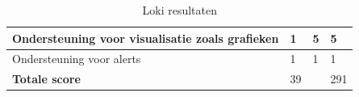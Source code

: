 \begin{table}[]
\begin{tabular}{| m{20em} | m{2cm} | m{2cm} | m{2cm} | }
        Ondersteuning voor visualisatie zoals grafieken                                                                   & 1                     & 5                   & 5                             \\ \hline
        Ondersteuning voor alerts                                                                                         & 1                     & 1                   & 1                             \\ \hline
        \textbf{Totale score}                                                                                             & 39                    &                     & 291                           \\ \hline
    \end{tabular}
    \caption{Loki resultaten}
    \label{tab:Loki-resultaten}
\end{table}